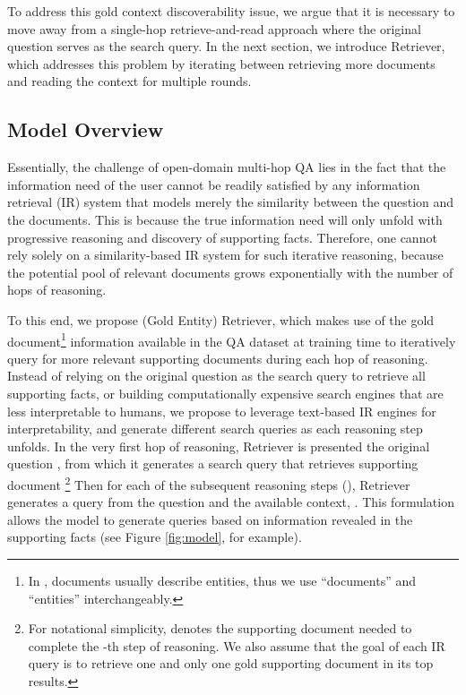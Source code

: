 To address this gold context discoverability issue, we argue that it is necessary to move away from a single-hop retrieve-and-read approach where the original question serves as the search query.
In the next section, we introduce \golden{} Retriever, which addresses this problem by iterating between retrieving more documents and reading the context for multiple rounds.

\subsection{Model Overview}

Essentially, the challenge of open-domain multi-hop QA lies in the fact that the information need of the user  cannot be readily satisfied by any information retrieval (IR) system that models merely the similarity between the question  and the documents.
This is because the true information need will only unfold with progressive reasoning and discovery of supporting facts.
Therefore, one cannot rely solely on a similarity-based IR system for such iterative reasoning, because the potential pool of relevant documents grows exponentially with the number of hops of reasoning.

To this end, we propose \golden{} (Gold Entity) Retriever, which makes use of the gold document\footnote{In \hotpotqa{}, documents usually describe entities, thus we use ``documents'' and ``entities'' interchangeably.} information available in the QA dataset at training time to iteratively query for more relevant supporting documents during each hop of reasoning.
Instead of relying on the original question as the search query to retrieve all supporting facts, or building computationally expensive search engines that are less interpretable to humans, we propose to leverage text-based IR engines for interpretability, and generate different search queries as each reasoning step unfolds.
In the very first hop of reasoning, \golden{} Retriever is presented the original question , from which it generates a search query  that retrieves supporting document \footnote{For notational simplicity,  denotes the supporting document needed to complete the -th step of reasoning. We also assume that the goal of each IR query is to retrieve one and only one gold supporting document in its top  results.}
Then for each of the subsequent reasoning steps (), \golden{} Retriever generates a query  from the question and the available context, .
This formulation allows the model to generate queries based on information revealed in the supporting facts (see Figure \ref{fig:model}, for example).


